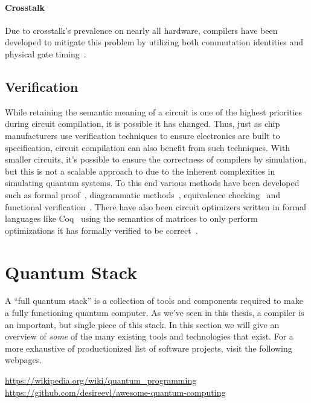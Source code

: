 \paragraph{Crosstalk}
Due to crosstalk's prevalence on nearly all hardware, compilers have been developed to mitigate this problem by utilizing both commutation identities and physical gate timing~\cite{crosstalk-commute,crosstalk-mitigation}. %

\subsection{Verification}

While retaining the semantic meaning of a circuit is one of the highest priorities during circuit compilation, it is possible it has changed.
Thus, just as chip manufacturers use verification techniques to ensure electronics are built to specification, circuit compilation can also benefit from such techniques.
With smaller circuits, it's possible to ensure the correctness of compilers by simulation, but this is not a scalable approach to due to the inherent complexities in simulating quantum systems.
To this end various methods have been developed such as formal proof~\cite{circuit-verification-formal-proof}, diagrammatic methods~\cite{circuit-verification-diagrammatic}, equivalence checking~\cite{circuit-verification-equivalence-check} and functional verification~\cite{circuit-verification-functional}.
There have also been circuit optimizers written in formal languages like Coq~\cite{coq} using the semantics of matrices to only perform optimizations it has formally verified to be correct~\cite{verified-optimizer}.


\section{Quantum Stack}

A ``full quantum stack'' is a collection of tools and components required to make a fully functioning quantum computer.
As we've seen in this thesis, a compiler is an important, but single piece of this stack.
In this section we will give an overview of \emph{some} of the many existing tools and technologies that exist.
For a more exhaustive of productionized list of software projects, visit the following webpages.
\begin{center}
    \url{https://wikipedia.org/wiki/quantum_programming}
    \url{https://github.com/desireevl/awesome-quantum-computing}
\end{center}

